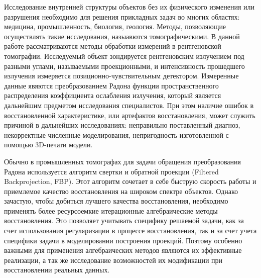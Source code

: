 
{\actualityandprogress} 

Исследование внутренней структуры объектов без их физического изменения или разрушения необходимо для решения прикладных задач во многих областях:  медицина, промышленность, биология, геология.
Методы, позволяющие осуществлять такие исследования, назыавются томографическими.
В данной работе рассматриваются методы обработки измерений в рентгеновской томографии.
Исследуемый объект зондируется рентгеновским излучением под разными углами, называемыми проекционными, и интенсивность прошедшего излучения измеряется позиционно-чувствительным детектором.
Измеренные данные явяются преобразованием Радона функции пространственного распределения коэффициента ослабления излучения, который является дальнейшим предметом исследования специалистов.
При этом наличие ошибок в восстановленной характеристике, или артефактов восстановления, может служить причиной в дальнейших исследованиях: неправильно поставленный диагноз, некорректные численные моделирования, непригодность изготовленной с помощью 3D-печати модели.

Обычно в промышленных томографах для задачи обращения преобразования Радона используется алгоритм свертки и обратной проекции (Filtered Backprojection, FBP).
Этот алгоритм сочетает в себе быструю скорость работы и приемлемое качество восстановления на широком спектре объектов.
Однако зачастую, чтобы добиться лучшего качества восстановления, необходимо применять более ресурсоемкие итерационные алгебраические методы восстановления.
Это позволяет учитывать специфику решаемой задачи, как за счет использования регуляризации в процессе восстановления, так и за счет учета специфики задачи в моделировании построения проекций.
Поэтому особенно важными для применения алгебраических методов являются их эффективные реализации, а так же исследование возможностей их модификации при восстановлении реальных данных.

